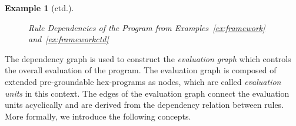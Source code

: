 \documentclass[11pt,fleqn,twoside]{article}
\newcommand\hex{{\sc hex}\xspace}
\newtheorem{example}{Example}
\begin{document}
{\begin{example}[ctd.]
\begin{figure}
					\endpgfgraphicnamed
					
					\caption{Rule Dependencies of the Program from Examples~\ref{ex:framework} and~\ref{ex:frameworkctd}}
					\label{fig:exruledep}
				\end{figure}
			\end{example}
			
			The dependency graph is used to construct the \emph{evaluation graph} which controls
			the overall evaluation of the program.
			The evaluation graph is composed of extended pre-groundable \hex{}-programs as nodes,
			which are called \emph{evaluation units} in this context. The edges of the evaluation graph
			connect the evaluation units acyclically and are derived from the dependency relation between rules.
			More formally, we introduce the following concepts.
			
}
\end{document}
